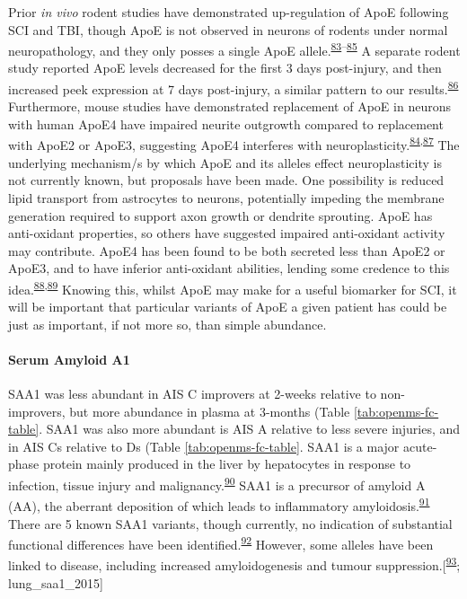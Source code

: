 \documentclass[
]{article}
\begin{document}
Prior \emph{in vivo} rodent studies have demonstrated up-regulation of ApoE following SCI and TBI, though ApoE is not observed in neurons of rodents under normal neuropathology, and they only posses a single ApoE allele.\textsuperscript{\protect\hyperlink{ref-iwata_traumatic_2005}{83}--\protect\hyperlink{ref-mahley_apolipoprotein_2006}{85}}
A separate rodent study reported ApoE levels decreased for the first 3 days post-injury, and then increased peek expression at 7 days post-injury, a similar pattern to our results.\textsuperscript{\protect\hyperlink{ref-yang_apolipoprotein_2018}{86}}
Furthermore, mouse studies have demonstrated replacement of ApoE in neurons with human ApoE4 have impaired neurite outgrowth compared to replacement with ApoE2 or ApoE3, suggesting ApoE4 interferes with neuroplasticity.\textsuperscript{\protect\hyperlink{ref-seitz_apolipoprotein_2003}{84},\protect\hyperlink{ref-white_impaired_2001}{87}}
The underlying mechanism/s by which ApoE and its alleles effect neuroplasticity is not currently known, but proposals have been made.
One possibility is reduced lipid transport from astrocytes to neurons, potentially impeding the membrane generation required to support axon growth or dendrite sprouting.
ApoE has anti-oxidant properties, so others have suggested impaired anti-oxidant activity may contribute.
ApoE4 has been found to be both secreted less than ApoE2 or ApoE3, and to have inferior anti-oxidant abilities, lending some credence to this idea.\textsuperscript{\protect\hyperlink{ref-mishra_inflammation_2018}{88},\protect\hyperlink{ref-miyata_apolipoprotein_1996}{89}}
Knowing this, whilst ApoE may make for a useful biomarker for SCI, it will be important that particular variants of ApoE a given patient has could be just as important, if not more so, than simple abundance.

\hypertarget{serum-amyloid-a1}{%
\paragraph{Serum Amyloid A1}\label{serum-amyloid-a1}}

SAA1 was less abundant in AIS C improvers at 2-weeks relative to non-improvers, but more abundance in plasma at 3-months (Table \ref{tab:openms-fc-table}.
SAA1 was also more abundant is AIS A relative to less severe injuries, and in AIS Cs relative to Ds (Table \ref{tab:openms-fc-table}.
SAA1 is a major acute-phase protein mainly produced in the liver by hepatocytes in response to infection, tissue injury and malignancy.\textsuperscript{\protect\hyperlink{ref-sun_serum_2016}{90}}
SAA1 is a precursor of amyloid A (AA), the aberrant deposition of which leads to inflammatory amyloidosis.\textsuperscript{\protect\hyperlink{ref-tape_direct_1988}{91}}
There are 5 known SAA1 variants, though currently, no indication of substantial functional differences have been identified.\textsuperscript{\protect\hyperlink{ref-lu_structural_2014}{92}}
However, some alleles have been linked to disease, including increased amyloidogenesis and tumour suppression.{[}\textsuperscript{\protect\hyperlink{ref-van_der_hilst_increased_2008}{93}}; lung\_saa1\_2015{]}
\end{document}
